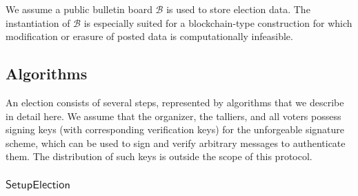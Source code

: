 \documentclass{llncs}
\newcommand{\func}[1]{\mathsf{#1}}
\begin{document}
We assume a public bulletin board $\mathcal{B}$ is used to store election data.
The instantiation of $\mathcal{B}$ is especially suited for a blockchain-type construction for which modification or erasure of posted data is computationally infeasible.


\subsection{Algorithms}

An election consists of several steps, represented by algorithms that we describe in detail here.
We assume that the organizer, the talliers, and all voters possess signing keys (with corresponding verification keys) for the unforgeable signature scheme, which can be used to sign and verify arbitrary messages to authenticate them.
The distribution of such keys is outside the scope of this protocol.


\subsubsection{\texorpdfstring{$\func{SetupElection}$}{SetupElection}}
\end{document}

